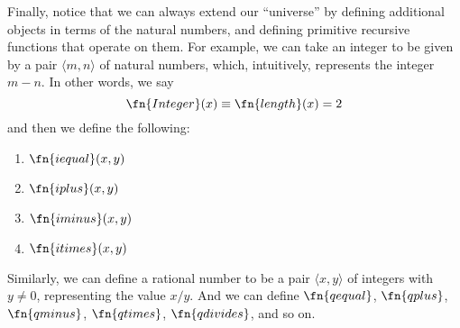 \documentclass[../../include/open-logic-section]{subfiles}
\begin{document}
Finally, notice that we can always extend our ``universe'' by defining
additional objects in terms of the natural numbers, and defining
primitive recursive functions that operate on them. For example, we
can take an integer to be given by a pair $\langle m, n \rangle$ of natural
numbers, which, intuitively, represents the integer $m-n$. In other
words, we say
\[
\fn{Integer}(x) \equiv \fn{length}(x) = 2
\]
and then we define the following:
\begin{enumerate}
\item $\fn{iequal}(x,y)$
\item $\fn{iplus}(x,y)$
\item $\fn{iminus}(x,y)$
\item $\fn{itimes}(x,y)$
\end{enumerate}
Similarly, we can define a rational number to be a pair $\langle x, y \rangle$
of integers with $y \neq 0$, representing the value $x / y$. And we
can define $\fn{qequal}$, $\fn{qplus}$, $\fn{qminus}$, $\fn{qtimes}$,
$\fn{qdivides}$, and so on.
\end{document}
